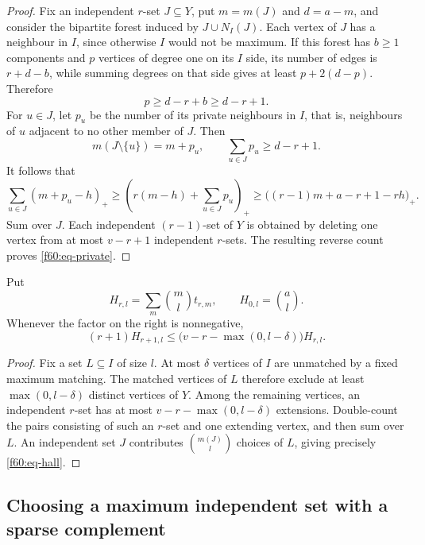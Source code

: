 \begin{proof}
Fix an independent $r$-set $J\subseteq Y$, put $m=m(J)$ and $d=a-m$,
and consider the bipartite forest induced by $J\cup N_I(J)$.
Each vertex of $J$ has a neighbour in $I$, since otherwise $I$ would not
be maximum.  If this forest has $b\ge1$ components and $p$ vertices of
degree one on its $I$ side, its number of edges is $r+d-b$, while summing
degrees on that side gives at least $p+2(d-p)$.  Therefore
\[
 p\ge d-r+b\ge d-r+1.
\]
For $u\in J$, let $p_u$ be the number of its private neighbours in $I$,
that is, neighbours of $u$ adjacent to no other member of $J$.  Then
\begin{equation}
 m(J\setminus\{u\})=m+p_u,\qquad
 \sum_{u\in J}p_u\ge d-r+1.
 \label{f60:eq-private-release}
\end{equation}
It follows that
\[
 \sum_{u\in J}(m+p_u-h)_+
 \ge \left(r(m-h)+\sum_{u\in J}p_u\right)_+
 \ge\bigl((r-1)m+a-r+1-rh\bigr)_+.
\]
Sum over $J$.  Each independent $(r-1)$-set of $Y$ is obtained by
deleting one vertex from at most $v-r+1$ independent $r$-sets.  The
resulting reverse count proves \eqref{f60:eq-private}.
\end{proof}

\begin{lemma}
\label{f60:lem-hall}
Put
\[
 H_{r,l}=\sum_m\binom ml t_{r,m},\qquad H_{0,l}=\binom al.
\]
Whenever the factor on the right is nonnegative,
\begin{equation}
 (r+1)H_{r+1,l}
 \le\bigl(v-r-\max(0,l-\delta)\bigr)H_{r,l}.
 \label{f60:eq-hall}
\end{equation}
\end{lemma}

\begin{proof}
Fix a set $L\subseteq I$ of size $l$.  At most $\delta$ vertices of $I$
are unmatched by a fixed maximum matching.  The matched vertices of $L$
therefore exclude at least $\max(0,l-\delta)$ distinct vertices of $Y$.
Among the remaining vertices, an independent $r$-set has at most
$v-r-\max(0,l-\delta)$ extensions.  Double-count the pairs consisting of
such an $r$-set and one extending vertex, and then sum over $L$.
An independent set $J$ contributes $\binom{m(J)}l$ choices of $L$,
giving precisely \eqref{f60:eq-hall}.
\end{proof}

\subsection{Choosing a maximum independent set with a sparse complement}
\label{f60:subsec-sparse}

